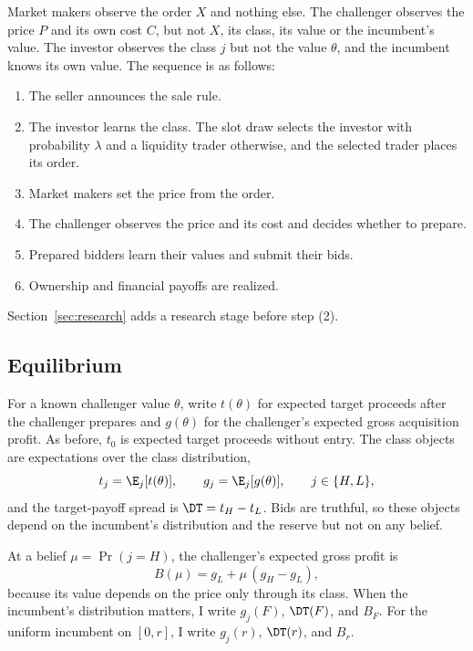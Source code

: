 Market makers observe the order \(X\) and nothing else. The challenger observes the price \(P\) and its own cost
\(C\), but not \(X\), its class, its value or the incumbent's value. The investor observes the class \(j\) but not
the value \(\theta\), and the incumbent knows its own value. The sequence is as follows:
\begin{enumerate}[label=(\arabic*),leftmargin=2.5em]
\item The seller announces the sale rule.
\item The investor learns the class. The slot draw selects the investor with probability \(\lambda\) and a
liquidity trader otherwise, and the selected trader places its order.
\item Market makers set the price from the order.
\item The challenger observes the price and its cost and decides whether to prepare.
\item Prepared bidders learn their values and submit their bids.
\item Ownership and financial payoffs are realized.
\end{enumerate}
Section~\ref{sec:research} adds a research stage before step (2).

\subsection{Equilibrium}\label{sec:equilibrium}

For a known challenger value \(\theta\), write \(t(\theta)\) for expected target proceeds after the challenger
prepares and \(g(\theta)\) for the challenger's expected gross acquisition profit. As before, \(t_0\) is expected
target proceeds without entry. The class objects are expectations over the class distribution,
\[
t_j=\E_j[t(\theta)],\qquad g_j=\E_j[g(\theta)],\qquad j\in\{H,L\},
\]
and the target-payoff spread is \(\DT=t_H-t_L\). Bids are truthful, so these objects depend on the incumbent's
distribution and the reserve but not on any belief.

At a belief \(\mu=\Pr(j=H)\), the challenger's expected gross profit is
\[
B(\mu)=g_L+\mu\,(g_H-g_L),
\]
because its value depends on the price only through its class. When the incumbent's distribution matters, I
write \(g_j(F)\), \(\DT(F)\), and \(B_F\). For the uniform incumbent on \([0,r]\), I write \(g_j(r)\),
\(\DT(r)\), and \(B_r\).

